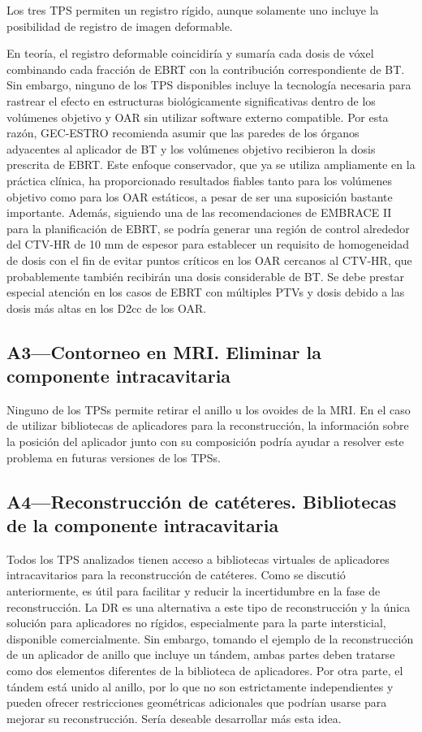 \documentclass[
  a4paper,
]{scrreprt}
\begin{document}
Los tres TPS permiten un registro rígido, aunque solamente uno incluye
la posibilidad de registro de imagen deformable.

En teoría, el registro deformable coincidiría y sumaría cada dosis de
vóxel combinando cada fracción de EBRT con la contribución
correspondiente de BT. Sin embargo, ninguno de los TPS disponibles
incluye la tecnología necesaria para rastrear el efecto en estructuras
biológicamente significativas dentro de los volúmenes objetivo y OAR sin
utilizar software externo compatible. Por esta razón, GEC-ESTRO
recomienda asumir que las paredes de los órganos adyacentes al aplicador
de BT y los volúmenes objetivo recibieron la dosis prescrita de EBRT.
Este enfoque conservador, que ya se utiliza ampliamente en la práctica
clínica, ha proporcionado resultados fiables tanto para los volúmenes
objetivo como para los OAR estáticos, a pesar de ser una suposición
bastante importante. Además, siguiendo una de las recomendaciones de
EMBRACE II para la planificación de EBRT, se podría generar una región
de control alrededor del CTV-HR de 10 mm de espesor para establecer un
requisito de homogeneidad de dosis con el fin de evitar puntos críticos
en los OAR cercanos al CTV-HR, que probablemente también recibirán una
dosis considerable de BT. Se debe prestar especial atención en los casos
de EBRT con múltiples PTVs y dosis debido a las dosis más altas en los
D2cc de los OAR.

\hypertarget{sec-a3}{%
\subsection{A3---Contorneo en MRI. Eliminar la componente
intracavitaria}\label{sec-a3}}

Ninguno de los TPSs permite retirar el anillo u los ovoides de la MRI.
En el caso de utilizar bibliotecas de aplicadores para la
reconstrucción, la información sobre la posición del aplicador junto con
su composición podría ayudar a resolver este problema en futuras
versiones de los TPSs.

\hypertarget{sec-a4}{%
\subsection{A4---Reconstrucción de catéteres. Bibliotecas de la
componente intracavitaria}\label{sec-a4}}

Todos los TPS analizados tienen acceso a bibliotecas virtuales de
aplicadores intracavitarios para la reconstrucción de catéteres. Como se
discutió anteriormente, es útil para facilitar y reducir la
incertidumbre en la fase de reconstrucción. La DR es una alternativa a
este tipo de reconstrucción y la única solución para aplicadores no
rígidos, especialmente para la parte intersticial, disponible
comercialmente. Sin embargo, tomando el ejemplo de la reconstrucción de
un aplicador de anillo que incluye un tándem, ambas partes deben
tratarse como dos elementos diferentes de la biblioteca de aplicadores.
Por otra parte, el tándem está unido al anillo, por lo que no son
estrictamente independientes y pueden ofrecer restricciones geométricas
adicionales que podrían usarse para mejorar su reconstrucción. Sería
deseable desarrollar más esta idea.
\end{document}
